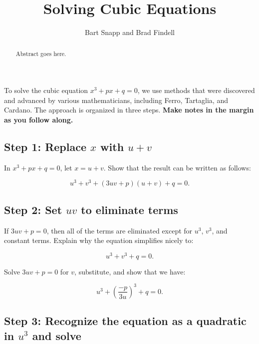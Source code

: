 \documentclass{ximera}
\title{Solving Cubic Equations}
\author{Bart Snapp and Brad Findell}
\begin{document}
\begin{abstract}
Abstract goes here.  
\end{abstract}
\maketitle

\label{A:solvingCubics}

To solve the cubic equation $x^3+px+q=0$, we use methods that were discovered and advanced by various mathematicians, including Ferro, Tartaglia, and Cardano.  The approach is organized in three steps.  \textbf{Make notes in the margin as you follow along.}  


\subsection{Step 1:  Replace $x$ with $u+v$}
In $x^3+px+q=0$, let $x = u + v$.  %
Show that the result can be written as follows:  

$$u^3+v^3+(3uv+p)(u+v)+q = 0.$$

\subsection{Step 2: Set $uv$ to eliminate terms}
If $3uv+p=0$, then all of the terms are eliminated except for $u^3$, $v^3$, and constant terms. Explain why the equation simplifies nicely to:

$$u^3+v^3 + q = 0.$$

Solve $3uv+p=0$ for $v$, substitute, and show that we have:  

$$u^3+\left( \frac{-p}{3u}\right)^3+q=0.$$

\subsection{Step 3:  Recognize the equation as a quadratic in $u^3$ and solve}
\end{document}
